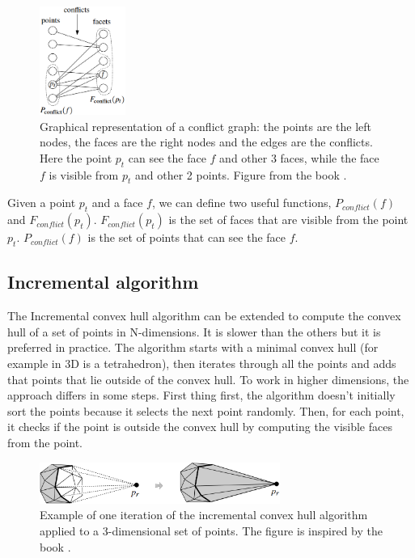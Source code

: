 \documentclass{article}
\begin{document}
\begin{figure}[h]
\centering
\includegraphics[width=0.25\textwidth]{higher_dim/conflict_graph.png}
\caption{\label{fig:conflict_graph} Graphical representation of a conflict graph: the points are the left nodes, the faces are the right nodes and the edges are the conflicts. Here the point $p_t$ can see the face $f$ and other 3 faces, while the face $f$ is visible from $p_t$ and other 2 points. Figure from the book \cite{computgeombook}.}
\end{figure}

Given a point $p_t$ and a face $f$, we can define two useful functions, $P_{conflict}(f)$ and $F_{conflict}(p_t)$. $F_{conflict}(p_t)$ is the set of faces that are visible from the point $p_t$. $P_{conflict}(f)$ is the set of points that can see the face $f$.

\subsection{Incremental algorithm}

The Incremental convex hull algorithm can be extended to compute the convex hull of a set of points in N-dimensions. It is slower than the others but it is preferred in practice. The algorithm starts with a minimal convex hull (for example in 3D is a tetrahedron), then iterates through all the points and adds that points that lie outside of the convex hull. To work in higher dimensions, the approach differs in some steps. First thing first, the algorithm doesn't initially sort the points because it selects the next point randomly. Then, for each point, it checks if the point is outside the convex hull by computing the visible faces from the point. 

\begin{figure}[h]
\centering
\includegraphics[width=0.7\textwidth]{higher_dim/incremental_3d_visual.png}
\caption{\label{fig:incremental_3d_visual}Example of one iteration of the incremental convex hull algorithm applied to a 3-dimensional set of points. The figure is inspired by the book \cite{computgeombook}.}
\end{figure}
\end{document}
